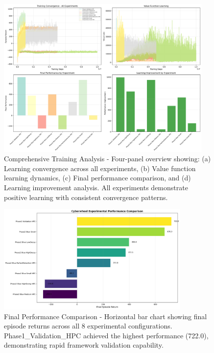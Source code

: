 \documentclass[11pt]{article}
\theoremstyle{definition}
\theoremstyle{plain}
\begin{document}
\begin{figure}[H]
\centering
\includegraphics[width=0.95\textwidth]{../Accurate_Cyberwheel_Analysis.png}
\caption{Comprehensive Training Analysis - Four-panel overview showing: (a) Learning convergence across all experiments, (b) Value function learning dynamics, (c) Final performance comparison, and (d) Learning improvement analysis. All experiments demonstrate positive learning with consistent convergence patterns.}
\label{fig:comprehensive_analysis}
\end{figure}

\begin{figure}[H]
\centering
\includegraphics[width=0.85\textwidth]{../Figure2_Performance_Comparison.png}
\caption{Final Performance Comparison - Horizontal bar chart showing final episode returns across all 8 experimental configurations. Phase1\_Validation\_HPC achieved the highest performance (722.0), demonstrating rapid framework validation capability.}
\label{fig:performance_comparison}
\end{figure}
\end{document}
